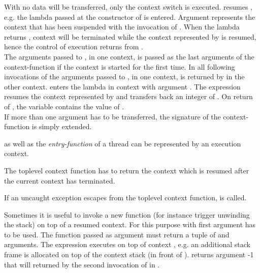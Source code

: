 With  no data will be transferred, only the
context switch is executed.
 resumes , e.g. the lambda passed at the constructor of
 is entered. Argument  represents the context that has been
suspended with the invocation of . When the lambda returns
, context  will be terminated while the context represented
by  is resumed, hence the control of execution returns from
.\\
\newline
The arguments passed to , in one context, is
passed as the last arguments of the context-function if the context is started
for the first time. In all following invocations of
 the arguments passed to
, in one context, is returned by
 in the other context.
 enters the lambda in context  with argument .
The expression  resumes the context represented by  and
transfers back an integer of . On return of , the variable
 contains the value of .\\
\newline
If more than one argument has to be transferred, the signature of the
context-function is simply extended.


\main as well as the \emph{entry-function} of a thread can be represented by an
execution context.


The toplevel context function has to return the context which is resumed after
the current context has terminated.


If an uncaught exception escapes from the toplevel context function,
 is called.


Sometimes it is useful to invoke a new function (for instance trigger unwinding
the stack) on top of a resumed context. For this purpose
 with first argument 
has to be used. The function passed as argument must return a tuple of
 and arguments.
The expression  executes  on
top of context , e.g. an additional stack frame is allocated on top of
the context stack (in front of ).  returns argument -1 that
will returned by the second invocation of  in .


